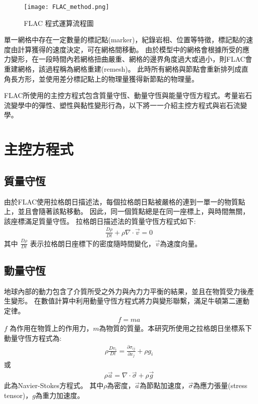 \begin{figure*}[ht!]
    \centering
    \texttt{[image: FLAC\_method.png]}
    \caption{FLAC 程式運算流程圖
    }
    \label{fig::FLAC_method}
\end{figure*}
單一網格中存在一定數量的標記點(marker)，紀錄岩相、位置等特徵，標記點的速度由計算獲得的速度決定，可在網格間移動。
由於模型中的網格會根據所受的應力變形，在一段時間內若網格扭曲嚴重、網格的邊界角度過大或過小，則FLAC會重建網格，該過程稱為網格重建(remesh)。
此時所有網格與節點會重新排列成直角長方形，並使用差分標記點上的物理量獲得新節點的物理量。

FLAC所使用的主控方程式包含質量守恆、動量守恆與能量守恆方程式。考量岩石流變學中的彈性、塑性與黏性變形行為，以下將一一介紹主控方程式與岩石流變學。
\section{主控方程式}

\subsection{質量守恆}
由於FLAC使用拉格朗日描述法，每個拉格朗日點被嚴格的連到一單一的物質點上，並且會隨著該點移動。
因此，同一個質點總是在同一座標上，與時間無關，該座標滿足質量守恆。
拉格朗日描述法的質量守恆方程式如下:
\begin{align}
\frac{D\rho}{Dt}+\rho\nabla\cdot\vec v =0 
\label{eqn:MASS_Lagrangian}
\end{align}
其中 $\frac{D\rho}{Dt}$ 表示拉格朗日座標下的密度隨時間變化，$\vec v$為速度向量。

\subsection{動量守恆}
地球內部的動力包含了介質所受之外力與內力力平衡的結果，並且在物質受力後產生變形。
在數值計算中利用動量守恆方程式將力與變形聯繫，滿足牛頓第二運動定律。
\begin{align}
f=ma
\end{align}
$f$ 為作用在物質上的作用力，$m$為物質的質量。本研究所使用之拉格朗日坐標系下動量守恆方程式為:
\begin{align}
\rho \frac{ Dv_{i}}{Dt} = \frac{\partial \sigma_{ij}}{\partial x_j}+\rho g_i\label{eqn:momentum Lagrangian}
\end{align}
或
\begin{align}
\rho \vec a = \nabla\cdot\vec\sigma+\rho\vec g\label{eqn:momentum Lagrangian2}
\end{align}
此為Navier-Stokes方程式。 其中$\rho$為密度，$\vec a$為節點加速度，$\vec\sigma$為應力張量(stress tensor)，$g$為重力加速度。

